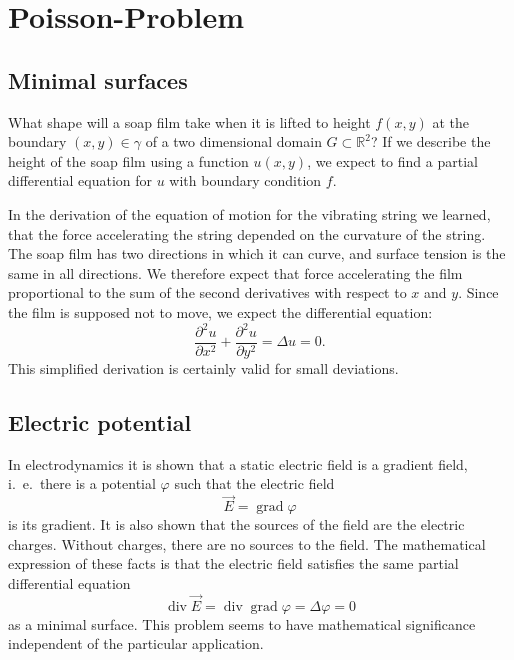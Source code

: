 %
%
%
\section{Poisson-Problem}

\subsection{Minimal surfaces\label{beispiele:minimal surfaces}}
What shape will a soap film take when it is lifted to height
$f(x,y)$ at the boundary $(x,y)\in\gamma$ of 
a two dimensional domain $G\subset \mathbb R^2$?
If we describe the height of the soap film using a function
$u(x,y)$, we expect to find a partial differential equation for $u$
with boundary condition $f$.

In the derivation of the equation of motion for the vibrating string
we learned, that the force accelerating the string depended on the
curvature of the string.
The soap film has two directions in which it can curve, and surface
tension is the same in all directions.
We therefore expect that force accelerating the film proportional
to the sum of the second derivatives with respect to $x$ and $y$.
Since the film is supposed not to move, we expect the differential
equation:
\[
\frac{\partial^2 u }{\partial x^2}+\frac{\partial^2 u }{\partial y^2}
=\Delta u =0.
\]
This simplified derivation is certainly valid for small deviations.

\subsection{Electric potential}
In electrodynamics it is shown that a static electric field is a 
gradient field, i.~e.~there is a potential $\varphi$ such that the
electric field
\[
\vec E=\operatorname{grad}\varphi
\]
is its gradient.
It is also shown that the sources of the field are the electric charges.
Without charges, there are no sources to the field.
The mathematical expression of these facts is that 
the electric field satisfies the same partial differential equation
\[
\operatorname{div}\vec E=\operatorname{div}\operatorname{grad}\varphi
=\Delta \varphi=0
\]
as a minimal surface.
This problem seems to have mathematical significance independent of the
particular application.

